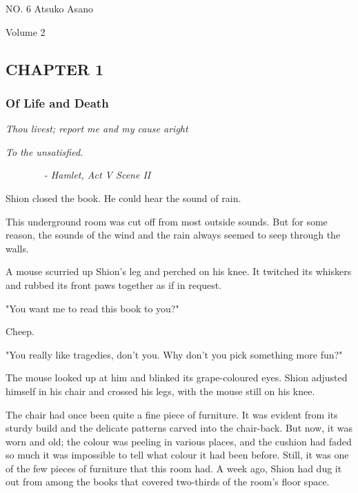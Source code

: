 \protect\hypertarget{titlepage.xhtml}{}{}

\protect\hypertarget{index_split_000.html}{}{}

NO. 6 \textbar{} Atsuko Asano

Volume 2

\hypertarget{index_split_000.htmlux5cux23calibre_pb_0}{}

\protect\hypertarget{index_split_001.html}{}{}

\hypertarget{index_split_001.htmlux5cux23calibre_pb_0}{}

\hypertarget{index_split_001.htmlux5cux23calibre_toc_2}{%
\subsection{CHAPTER 1}\label{index_split_001.htmlux5cux23calibre_toc_2}}

\subsubsection{Of Life and Death}

\emph{Thou livest; report me and my cause aright}

\emph{To the unsatisfied.}

\emph{~ ~ ~ ~ ~- Hamlet, Act V Scene II~}

Shion closed the book. He could hear the sound of rain.

This underground room was cut off from most outside sounds. But for some
reason, the sounds of the wind and the rain always seemed to seep
through the walls.~

A mouse scurried up Shion's leg and perched on his knee. It twitched its
whiskers and rubbed its front paws together as if in request.

"You want me to read this book to you?"

Cheep.

"You really like tragedies, don't you. Why don't you pick something more
fun?"

The mouse looked up at him and blinked its grape-coloured eyes. Shion
adjusted himself in his chair and crossed his legs, with the mouse still
on his knee.

The chair had once been quite a fine piece of furniture. It was evident
from its sturdy build and the delicate patterns carved into the
chair-back. But now, it was worn and old; the colour was peeling in
various places, and the cushion had faded so much it was impossible to
tell what colour it had been before. Still, it was one of the few pieces
of furniture that this room had. A week ago, Shion had dug it out from
among the books that covered two-thirds of the room's floor space.

